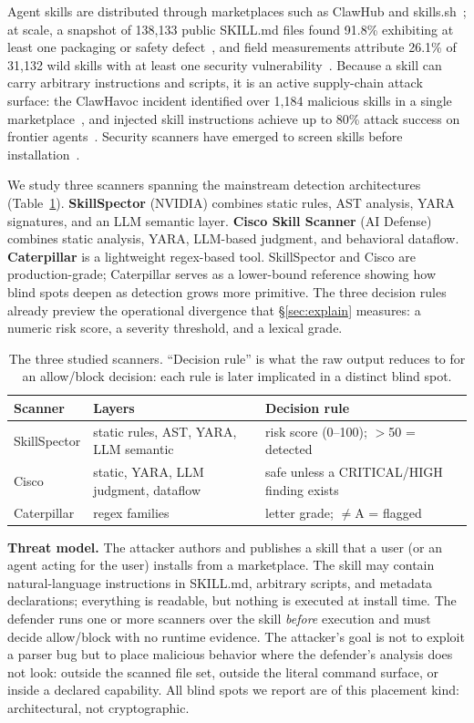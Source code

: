 \documentclass[sigconf,nonacm]{acmart}
\begin{document}
Agent skills are distributed through marketplaces such as ClawHub and skills.sh~\cite{clawhub2026}; at scale, a snapshot of 138{,}133 public SKILL.md files found 91.8\% exhibiting at least one packaging or safety defect~\cite{reusability2026}, and field measurements attribute 26.1\% of 31{,}132 wild skills with at least one security vulnerability~\cite{skillscan2026}. Because a skill can carry arbitrary instructions and scripts, it is an active supply-chain attack surface: the ClawHavoc incident identified over 1{,}184 malicious skills in a single marketplace~\cite{clawhub2026}, and injected skill instructions achieve up to 80\% attack success on frontier agents~\cite{skillinject2026}. Security scanners have emerged to screen skills before installation~\cite{locatejudge2026}.

We study three scanners spanning the mainstream detection architectures (Table~\ref{tab:scanners}). \textbf{SkillSpector} (NVIDIA) combines static rules, AST analysis, YARA signatures, and an LLM semantic layer. \textbf{Cisco Skill Scanner} (AI Defense) combines static analysis, YARA, LLM-based judgment, and behavioral dataflow. \textbf{Caterpillar} is a lightweight regex-based tool. SkillSpector and Cisco are production-grade; Caterpillar serves as a lower-bound reference showing how blind spots deepen as detection grows more primitive. The three decision rules already preview the operational divergence that \S\ref{sec:explain} measures: a numeric risk score, a severity threshold, and a lexical grade.

\begin{table}[t]
\caption{The three studied scanners. ``Decision rule'' is what the raw output reduces to for an allow/block decision: each rule is later implicated in a distinct blind spot.}
\label{tab:scanners}
\small
\begin{tabular}{@{}p{1.5cm}p{2.6cm}p{3.6cm}@{}}
\toprule
Scanner & Layers & Decision rule \\
\midrule
SkillSpector & static rules, AST, YARA, LLM semantic & risk score (0--100); $>$50 = detected \\
Cisco & static, YARA, LLM judgment, dataflow & safe unless a CRITICAL/HIGH finding exists \\
Caterpillar & regex families & letter grade; $\neq$A = flagged \\
\bottomrule
\end{tabular}
\end{table}

\textbf{Threat model.} The attacker authors and publishes a skill that a user (or an agent acting for the user) installs from a marketplace. The skill may contain natural-language instructions in SKILL.md, arbitrary scripts, and metadata declarations; everything is readable, but nothing is executed at install time. The defender runs one or more scanners over the skill \emph{before} execution and must decide allow/block with no runtime evidence. The attacker's goal is not to exploit a parser bug but to place malicious behavior where the defender's analysis does not look: outside the scanned file set, outside the literal command surface, or inside a declared capability. All blind spots we report are of this placement kind: architectural, not cryptographic.
\end{document}
